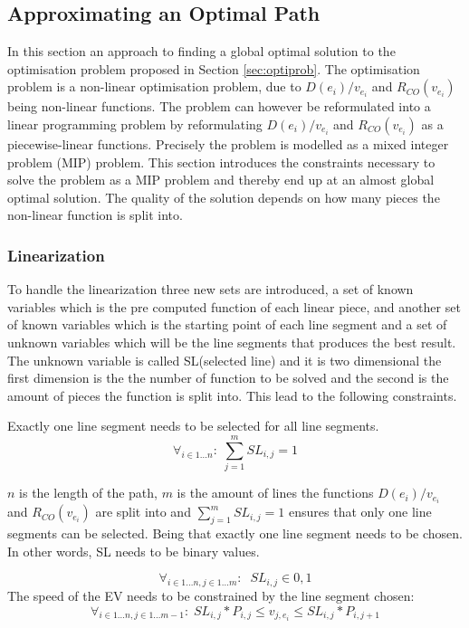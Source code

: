 
\subsection{Approximating an Optimal Path}\label{sec:LP}
In this section an approach to finding a global optimal solution to the optimisation problem proposed in Section \ref{sec:optiprob}. The optimisation problem is a non-linear optimisation problem, due to \( D(e_i)/v_{e_i} \) and $R_{CO}(v_{e_i})$ being non-linear functions. The problem can however be reformulated into a linear programming problem by reformulating \( D(e_i)/v_{e_i} \) and $R_{CO}(v_{e_i})$ as a piecewise-linear functions. Precisely the problem is modelled as a mixed integer problem (MIP) problem. This section introduces the constraints necessary to solve the problem as a MIP problem and thereby end up at an almost global optimal solution. The quality of the solution depends on how many pieces the non-linear function is split into. 

\subsubsection{Linearization}
To handle the linearization three new sets are introduced, a set of known variables which is the pre computed function of each linear piece, and another set of known variables which is the starting point of each line segment and a set of unknown variables which will be the line segments that produces the best result. The unknown variable is called SL(selected line) and it is two dimensional the first dimension is the the number of function to be solved and the second is the amount of pieces the function is split into. This lead to the following constraints.   

Exactly one line segment needs to be selected for all line segments. 
\begin{equation*}
\forall_{i\in1 \dots n }:\; \sum_{j=1}^{m} SL_{i,j} = 1
\end{equation*}

$n$ is the length of the path, $m$ is the amount of lines the functions \( D(e_i)/v_{e_i} \) and $R_{CO}(v_{e_i})$ are split into and $\sum_{j=1}^{m} SL_{i,j} = 1$ ensures that only one line segments can be selected.
Being that exactly one line segment needs to be chosen. In other words, SL needs to be binary values. 

\begin{equation*}
\forall_{i\in1 \dots n, j \in 1 \dots m}: \; \; SL_{i,j} \in{0,1} 
\end{equation*}
The speed of the EV needs to be constrained by the line segment chosen:
\begin{equation*}
\forall_{i\in1 \dots n, j \in 1 \dots m-1}:\; SL_{i,j} * P_{i,j}  \le  v_{j,e_i} \le SL_{i,j}*P_{i,j+1}
\end{equation*}

